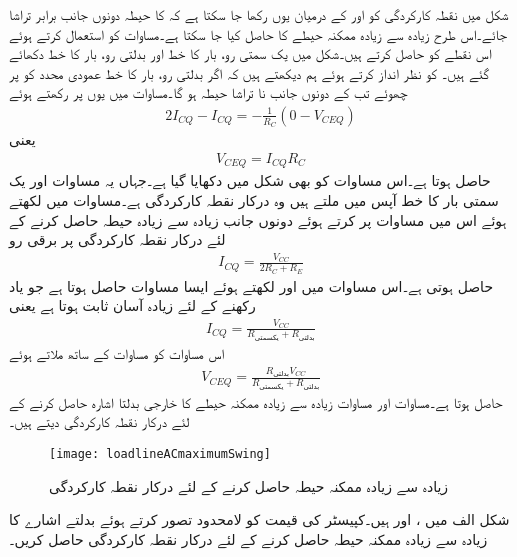 شکل  میں نقطہ کارکردگی کو  اور   کے درمیان یوں رکھا جا سکتا ہے کہ  کا حیطہ دونوں جانب برابر تراشا جائے۔اس طرح زیادہ سے زیادہ ممکنہ حیطے کا  حاصل کیا جا سکتا ہے۔مساوات  کو استعمال کرتے ہوئے اس نقطے کو حاصل کرتے ہیں۔شکل  میں یک سمتی رو، بار کا خط اور بدلتی رو، بار کا خط دکھائے گئے ہیں۔ کو نظر انداز کرتے ہوئے ہم دیکھتے ہیں کہ اگر بدلتی رو، بار کا خط عمودی محدد کو  پر چھوئے تب  کے دونوں جانب نا تراشا حیطہ  ہو گا۔مساوات  میں یوں  پر  رکھتے ہوئے
 \begin{align*}
2 I_{CQ}-I_{CQ}=-\frac{1}{R_C} \left(0-V_{CEQ} \right)
\end{align*}
یعنی
 \begin{align}\label{مساوات_ٹرانزسٹر_زیادہ_حیطہ_الف}
V_{CEQ}=I_{CQ} R_C
\end{align}
حاصل ہوتا ہے۔اس مساوات کو بھی شکل میں دکھایا گیا ہے۔جہاں یہ مساوات اور یک سمتی بار کا خط آپس میں ملتے ہیں وہ درکار نقطہ کارکردگی ہے۔مساوات  میں  لکھتے ہوئے اس میں مساوات  پر کرتے ہوئے دونوں جانب زیادہ سے زیادہ حیطہ حاصل کرنے کے لئے درکار نقطہ کارکردگی پر برقی رو 
\begin{align*}
I_{CQ}=\frac{V_{CC}}{2 R_C+R_E}
\end{align*}
حاصل ہوتی ہے۔اس مساوات میں  اور  لکھتے ہوئے ایسا مساوات حاصل ہوتا ہے جو یاد رکھنے کے لئے زیادہ آسان ثابت ہوتا ہے یعنی
\begin{align}\label{مساوات_ٹرانزسٹر_زیادہ_حیطہ_ب}
I_{CQ}=\frac{V_{CC}}{R_{\textrm{یکسمتی}}+R_{\textrm{بدلتی}}}
\end{align}
اس مساوات کو مساوات  کے ساتھ ملاتے ہوئے
\begin{align}\label{مساوات_ٹرانزسٹر_زیادہ_حیطہ_پ}
V_{CEQ}=\frac{R_{\textrm{بدلتی}} V_{CC}}{R_{\textrm{یکسمتی}}+R_{\textrm{بدلتی}}}
\end{align}
حاصل ہوتا ہے۔مساوات  اور مساوات  زیادہ سے زیادہ ممکنہ حیطے کا خارجی بدلتا اشارہ حاصل کرنے کے لئے درکار نقطہ کارکردگی دیتے ہیں۔ 
%
\begin{figure}
\centering
\texttt{[image: loadlineACmaximumSwing]}
\caption{زیادہ سے زیادہ ممکنہ حیطہ حاصل کرنے کے لئے درکار نقطہ کارکردگی}
\label{شکل_ٹرانزسٹر_زیادہ_حیطہ_نکتہ_کارکردگی}
\end{figure}
شکل  الف میں ،  اور
  ہیں۔کپیسٹر کی قیمت کو لامحدود تصور کرتے ہوئے بدلتے اشارے کا زیادہ سے زیادہ ممکنہ حیطہ حاصل کرنے کے لئے درکار نقطہ کارکردگی حاصل کریں۔

